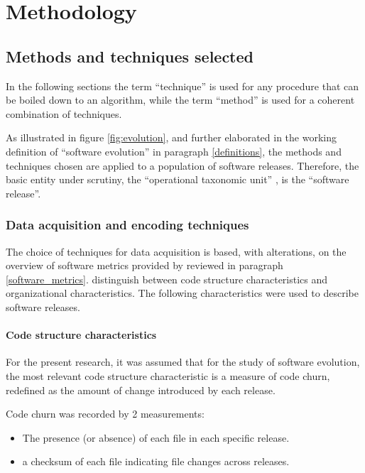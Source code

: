 
\chapter{Methodology} %

\label{Chapter3} %


\section{Methods and techniques selected}
In the following sections the term “technique” is used for any procedure that can be boiled down to an algorithm, while the term “method” is used for a coherent combination of techniques.

As illustrated in figure \ref{fig:evolution}, and further elaborated in the working definition of “software evolution” in paragraph \ref{definitions}, the methods and techniques chosen are applied to a population of software releases. Therefore, the basic entity under scrutiny, the “operational taxonomic unit” \citep{Sokal1986a}, is the “software release”.

\subsection{Data acquisition and encoding techniques}
\label{data_acquisition}

The choice of techniques for data acquisition is based, with alterations, on the overview of software metrics provided by \citet{Nagappan2008a} reviewed in paragraph \ref{software_metrics}. \citet{Nagappan2008a} distinguish between code structure characteristics and organizational characteristics. The following characteristics were used to describe software releases.

\subsubsection{Code structure characteristics}
For the present research, it was assumed that for the study of software evolution, the most relevant code structure characteristic is a measure of code churn, redefined as the amount of change introduced by each release.

\noindent
Code churn was recorded by 2 measurements: 
\begin{itemize}
\item{The presence (or absence) of each file in each specific release.}
\item{a checksum of each file indicating file changes across releases.}
\end{itemize}

